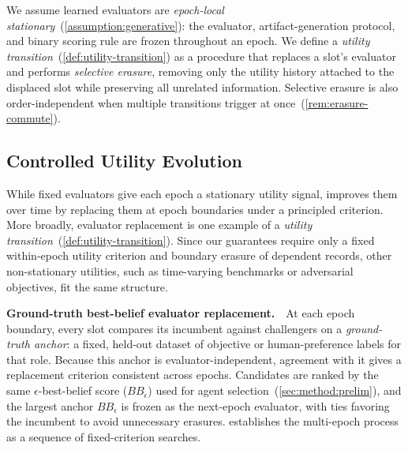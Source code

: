 We assume learned evaluators are \emph{epoch-local stationary}~(\cref{assumption:generative}): the evaluator, artifact-generation protocol, and binary scoring rule are frozen throughout an epoch. We define a \emph{utility transition}~(\cref{def:utility-transition}) as a procedure that replaces a slot's evaluator and performs \emph{selective erasure}, removing only the utility history attached to the displaced slot while preserving all unrelated information. Selective erasure is also order-independent when multiple transitions trigger at once~(\cref{rem:erasure-commute}).




\subsection{Controlled Utility Evolution}
\label{sec:method:utility}
While fixed evaluators give each epoch a stationary utility signal, \ourmethod improves them over time by replacing them at epoch boundaries under a principled criterion. More broadly, evaluator replacement is one example of a \emph{utility transition}~(\cref{def:utility-transition}). Since our guarantees require only a fixed within-epoch utility criterion and boundary erasure of dependent records, other non-stationary utilities, such as time-varying benchmarks or adversarial objectives, fit the same structure.


\noindent\textbf{Ground-truth best-belief evaluator replacement.}~~At each epoch boundary, every slot compares its incumbent against challengers on a \emph{ground-truth anchor}: a fixed, held-out dataset of objective or human-preference labels for that role. Because this anchor is evaluator-independent, agreement with it gives a replacement criterion consistent across epochs. Candidates are ranked by the same $\epsilon$-best-belief score ($BB_\epsilon$) used for agent selection~(\cref{sec:method:prelim}), and the largest anchor $BB_\epsilon$ is frozen as the next-epoch evaluator, with ties favoring the incumbent to avoid unnecessary erasures.  establishes the multi-epoch process as a sequence of fixed-criterion searches.


